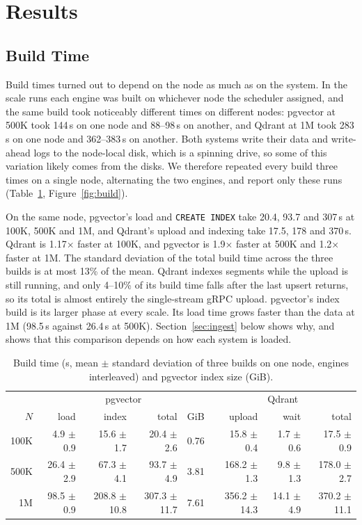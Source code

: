 \documentclass[sigconf, nonacm]{acmart}
\begin{document}
\section{Results}

\subsection{Build Time}
\label{sec:build}

Build times turned out to depend on the node as much as on the system. In the scale
runs each engine was built on whichever node the scheduler assigned, and the same
build took noticeably different times on different nodes: pgvector at 500K took 144\,s
on one node and 88--98\,s on another, and Qdrant at 1M took 283\,s on one node and
362--383\,s on another. Both systems write their data and write-ahead logs to the
node-local disk, which is a spinning drive, so some of this variation likely comes from
the disks. We therefore repeated every build three times on a single node, alternating
the two engines, and report only these runs (Table~\ref{tab:build},
Figure~\ref{fig:build}).

On the same node, pgvector's load and \texttt{CREATE INDEX} take 20.4, 93.7 and 307\,s
at 100K, 500K and 1M, and Qdrant's upload and indexing take 17.5, 178 and 370\,s. Qdrant
is 1.17$\times$ faster at 100K, and pgvector is 1.9$\times$ faster at 500K and
1.2$\times$ faster at 1M. The standard deviation of the total build time across the three
builds is at most 13\% of the mean. Qdrant indexes segments while the upload is still running, and only
4--10\% of its build time falls after the last upsert returns, so its total is almost
entirely the single-stream gRPC upload. pgvector's index build is its larger phase at
every scale. Its load time grows faster than the data at 1M (98.5\,s against 26.4\,s at
500K). Section~\ref{sec:ingest} below shows why, and shows that this comparison depends on how
each system is loaded.

\begin{table}[t]
  \caption{Build time (s, mean $\pm$ standard deviation of three builds on one node,
  engines interleaved) and pgvector index size (GiB).}
  \label{tab:build}
  \small
  \begin{tabular}{r|rrrr|rrr}
    \toprule
     & \multicolumn{4}{c|}{pgvector} & \multicolumn{3}{c}{Qdrant} \\
    $N$ & load & index & total & GiB & upload & wait & total \\
    \midrule
    100K & 4.9 $\pm$ 0.9 & 15.6 $\pm$ 1.7 & 20.4 $\pm$ 2.6 & 0.76 & 15.8 $\pm$ 0.4 & 1.7 $\pm$ 0.6 & 17.5 $\pm$ 0.9 \\
    500K & 26.4 $\pm$ 2.9 & 67.3 $\pm$ 4.1 & 93.7 $\pm$ 4.9 & 3.81 & 168.2 $\pm$ 1.3 & 9.8 $\pm$ 1.3 & 178.0 $\pm$ 2.7 \\
    1M & 98.5 $\pm$ 0.9 & 208.8 $\pm$ 10.8 & 307.3 $\pm$ 11.7 & 7.61 & 356.2 $\pm$ 14.3 & 14.1 $\pm$ 4.9 & 370.2 $\pm$ 11.1 \\
    \bottomrule
  \end{tabular}
\end{table}
\end{document}
